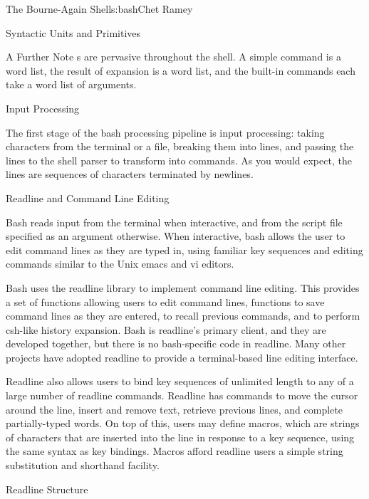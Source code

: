 \begin{aosachapter}{The Bourne-Again Shell}{s:bash}{Chet Ramey}
\begin{aosasect1}{Syntactic Units and Primitives}
\begin{aosasect2}{A Further Note}
s are pervasive throughout the shell.  A simple
command is a word list, the result of expansion is a word list, and
the built-in commands each take a word list of arguments.

\end{aosasect2}

\end{aosasect1}

\begin{aosasect1}{Input Processing}

The first stage of the bash processing pipeline is input processing:
taking characters from the terminal or a file, breaking them into
lines, and passing the lines to the shell parser to transform into
commands.  As you would expect, the lines are
sequences of characters terminated by newlines.

\begin{aosasect2}{Readline and Command Line Editing}

Bash reads input from the terminal when interactive, and from the
script file specified as an argument otherwise.  When interactive,
bash allows the user to edit command lines as they are typed in, using
familiar key sequences and editing commands similar to the Unix emacs
and vi editors.

Bash uses the readline library to implement command line editing.
This provides a set of functions allowing users to edit command lines,
functions to save command lines as they are entered, to recall
previous commands, and to perform csh-like history expansion.  Bash is
readline's primary client, and they are developed together, but there
is no bash-specific code in readline.  Many other projects have
adopted readline to provide a terminal-based line editing interface.

Readline also allows users to bind key sequences of unlimited length
to any of a large number of readline commands.  Readline has commands
to move the cursor around the line, insert and remove text, retrieve
previous lines, and complete partially-typed words.  On top of this,
users may define macros, which are strings of characters that are
inserted into the line in response to a key sequence, using the same
syntax as key bindings.  Macros afford readline users a simple string
substitution and shorthand facility.

\begin{aosasect3}{Readline Structure}


\end{aosasect3}
\end{aosasect2}
\end{aosasect1}
\end{aosachapter}

